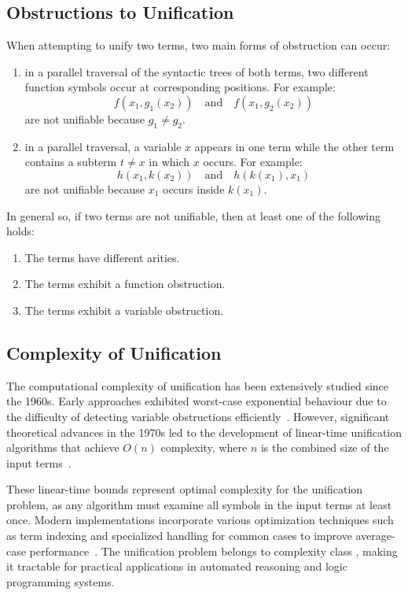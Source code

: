 \subsection{Obstructions to Unification}\label{subsec:obstructions-to-unification}
When attempting to unify two terms, two main forms of obstruction can occur:
\begin{enumerate}
    \item {} in a parallel traversal of the syntactic trees of both terms, two different function symbols occur at corresponding positions. For example:
    \[
    f(x_1, g_1(x_2)) \quad\text{and}\quad f(x_1, g_2(x_2))
    \]
    are not unifiable because \(g_1 \neq g_2\).
    \item {} in a parallel traversal, a variable \(x\) appears in one term while the other term contains a subterm \(t \neq x\) in which \(x\) occurs. For example:
    \[
    h(x_1, k(x_2)) \quad\text{and}\quad h(k(x_1), x_1)
    \]
    are not unifiable because \(x_1\) occurs inside \(k(x_1)\).
\end{enumerate}

In general so, if two terms are not unifiable, then at least one of the following holds:
\begin{enumerate}
    \item The terms have different arities.
    \item The terms exhibit a function obstruction.
    \item The terms exhibit a variable obstruction.
\end{enumerate}


\subsection{Complexity of Unification}\label{subsec:complexity-of-unification}
The computational complexity of unification has been extensively studied since the 1960s.
Early approaches exhibited worst-case exponential behaviour due to the difficulty of detecting variable obstructions efficiently~\cite{robinson1965}.
However, significant theoretical advances in the 1970s led to the development of linear-time unification algorithms that achieve \(O(n)\) complexity, where \(n\) is the combined size of the input terms~\cite{martelli1976, paterson1978}.

These linear-time bounds represent optimal complexity for the unification problem, as any algorithm must examine all symbols in the input terms at least once.
Modern implementations incorporate various optimization techniques such as term indexing and specialized handling for common cases to improve average-case performance~\cite{baader2001}.
The unification problem belongs to complexity class , making it tractable for practical applications in automated reasoning and logic programming systems.


